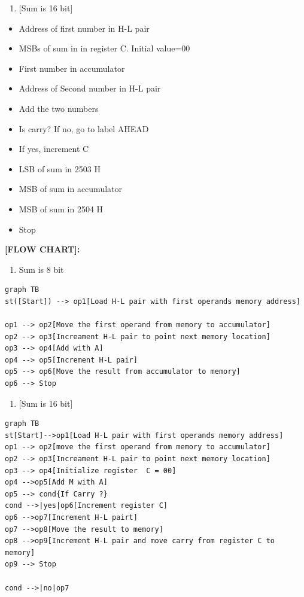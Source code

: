 \documentclass[11pt,twocolumn]{article}
\begin{document}
\begin{enumerate}
\def\labelenumi{\alph{enumi})}
\setcounter{enumi}{1}
\tightlist
\item
  {[}Sum is 16 bit{]}
\end{enumerate}

\begin{itemize}
\item
  Address of first number in H-L pair
\item
  MSBs of sum in in register C. Initial value=00
\item
  First number in accumulator
\item
  Address of Second number in H-L pair
\item
  Add the two numbers
\item
  Is carry? If no, go to label AHEAD
\item
  If yes, increment C
\item
  LSB of sum in 2503 H
\item
  MSB of sum in accumulator
\item
  MSB of sum in 2504 H
\item
  Stop
\end{itemize}

\textbf{{[}FLOW CHART{]}:}

\begin{enumerate}
\def\labelenumi{\alph{enumi})}
\tightlist
\item
  Sum is 8 bit
\end{enumerate}

\begin{verbatim}
graph TB
st([Start]) --> op1[Load H-L pair with first operands memory address]

op1 --> op2[Move the first operand from memory to accumulator]
op2 --> op3[Increament H-L pair to point next memory location]
op3 --> op4[Add with A]
op4 --> op5[Increment H-L pair]
op5 --> op6[Move the result from accumulator to memory]
op6 --> Stop
\end{verbatim}

\begin{enumerate}
\def\labelenumi{\alph{enumi})}
\setcounter{enumi}{1}
\tightlist
\item
  {[}Sum is 16 bit{]}
\end{enumerate}

\begin{verbatim}
graph TB
st[Start]-->op1[Load H-L pair with first operands memory address]
op1 --> op2[move the first operand from memory to accumulator]
op2 --> op3[Increament H-L pair to point next memory location]
op3 --> op4[Initialize register  C = 00]
op4 -->op5[Add M with A]
op5 --> cond{If Carry ?}
cond -->|yes|op6[Increment register C]
op6 -->op7[Increment H-L pairt]
op7 -->op8[Move the result to memory]
op8 -->op9[Increment H-L pair and move carry from register C to memory]
op9 --> Stop

cond -->|no|op7
\end{verbatim}
\end{document}

